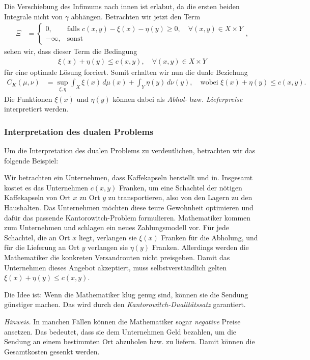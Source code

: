 Die Verschiebung des Infimums nach innen ist erlabut,
da die ersten beiden Integrale nicht von $\gamma$ abhängen.
Betrachten wir jetzt den Term
\begin{align*}
\Xi
&=
\begin{cases}
0,
& \text{falls } c(x,y) - \xi(x) - \eta(y) \geq 0
,\quad\forall (x,y) \in X \times Y
\\
-\infty,
& \text{sonst}
\end{cases}
,
\end{align*}
sehen wir,
dass dieser Term die Bedingung
\begin{align*}
\xi(x) + \eta(y) \leq c(x,y)
,\quad
\forall (x,y) \in X \times Y
\end{align*}
für eine optimale Lösung forciert.
Somit erhalten wir nun die duale Beziehung
\begin{align*}
C_K(\mu, \nu)
&=
\sup_{\xi, \eta}
\int_X \xi(x)\, d\mu(x)
+ \int_Y \eta(y)\, d\nu(y)
,\quad\text{wobei }
\xi(x) + \eta(y) \leq c(x,y)
.
\end{align*}
Die Funktionen $\xi(x)$ und $\eta(y)$ können dabei als
\emph{Abhol-} bzw. \emph{Lieferpreise} interpretiert werden.

\subsubsection{Interpretation des dualen Problems}
Um die Interpretation des dualen Problems zu verdeutlichen,
betrachten wir das folgende Beispiel:

Wir betrachten ein Unternehmen,
dass Kaffekapseln herstellt und in.
Insgesamt kostet es das Unternehmen $c(x,y)$ Franken,
um eine Schachtel der nötigen Kaffekapseln von Ort $x$ zu Ort $y$ zu transportieren,
also von den Lagern zu den Haushalten.
Das Unternehmen möchten diese teure Gewohnheit optimieren und
dafür das passende Kantorowitch-Problem formulieren.
Mathematiker kommen zum Unternehmen und schlagen ein neues Zahlungsmodell vor.
Für jede Schachtel,
die an Ort $x$ liegt,
verlangen sie $\xi(x)$ Franken für die Abholung,
und für die Lieferung an Ort $y$ verlangen sie $\eta(y)$ Franken.
Allerdings werden die Mathematiker die konkreten Versandrouten nicht preisgeben.
Damit das Unternehmen dieses Angebot akzeptiert,
muss selbstverständlich gelten $\xi(x)+\eta(y) \leq c(x,y)$.


Die Idee ist:
Wenn die Mathematiker klug genug sind,
können sie die Sendung günstiger machen.
Das wird durch den \emph{Kantorowitch-Dualitätssatz} garantiert.

\emph{Hinweis.}
In manchen Fällen können die Mathematiker sogar \emph{negative} Preise ansetzen.
Das bedeutet,
dass sie dem Unternehmen Geld bezahlen,
um die Sendung an einem bestimmten Ort abzuholen bzw. zu liefern.
Damit können die Gesamtkosten gesenkt werden.

